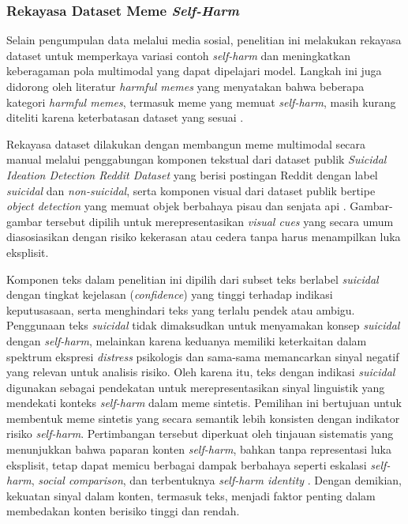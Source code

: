 \subsubsection{Rekayasa Dataset Meme \textit{Self-Harm}} \label{subsubsec:rekayasa_dataset_meme_self_harm}
Selain pengumpulan data melalui media sosial, penelitian ini melakukan rekayasa dataset untuk memperkaya variasi contoh \textit{self-harm} dan meningkatkan keberagaman pola multimodal yang dapat dipelajari model. Langkah ini juga didorong oleh literatur \textit{harmful memes} yang menyatakan bahwa beberapa kategori \textit{harmful memes}, termasuk meme yang memuat \textit{self-harm}, masih kurang diteliti karena keterbatasan dataset yang sesuai \cite{Sharma2022HarmfulMemes}. 

Rekayasa dataset dilakukan dengan membangun meme multimodal secara manual melalui penggabungan komponen tekstual dari dataset publik \textit{Suicidal Ideation Detection Reddit Dataset} yang berisi postingan Reddit dengan label \textit{suicidal} dan \textit{non-suicidal}, serta komponen visual dari dataset publik bertipe \textit{object detection} yang memuat objek berbahaya pisau dan senjata api \cite{mafi_alam_2023_suicidal_reddit}\cite{ali_weapon_knife_2025}. Gambar-gambar tersebut dipilih untuk merepresentasikan \textit{visual cues} yang secara umum diasosiasikan dengan risiko kekerasan atau cedera tanpa harus menampilkan luka eksplisit.

Komponen teks dalam penelitian ini dipilih dari subset teks berlabel \textit{suicidal} dengan tingkat kejelasan (\textit{confidence}) yang tinggi terhadap indikasi keputusasaan, serta menghindari teks yang terlalu pendek atau ambigu. Penggunaan teks \textit{suicidal} tidak dimaksudkan untuk menyamakan konsep \textit{suicidal} dengan \textit{self-harm}, melainkan karena keduanya memiliki keterkaitan dalam spektrum ekspresi \textit{distress} psikologis dan sama-sama memancarkan sinyal negatif yang relevan untuk analisis risiko. Oleh karena itu, teks dengan indikasi \textit{suicidal} digunakan sebagai pendekatan untuk merepresentasikan sinyal linguistik yang mendekati konteks \textit{self-harm} dalam meme sintetis. Pemilihan ini bertujuan untuk membentuk meme sintetis yang secara semantik lebih konsisten dengan indikator risiko \textit{self-harm}. Pertimbangan tersebut diperkuat oleh tinjauan sistematis yang menunjukkan bahwa paparan konten \textit{self-harm}, bahkan tanpa representasi luka eksplisit, tetap dapat memicu berbagai dampak berbahaya seperti eskalasi \textit{self-harm}, \textit{social comparison}, dan terbentuknya \textit{self-harm identity} \cite{Susi2023ViewingSelfHarmImages}. Dengan demikian, kekuatan sinyal dalam konten, termasuk teks, menjadi faktor penting dalam membedakan konten berisiko tinggi dan rendah.

